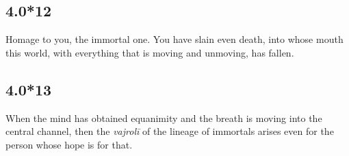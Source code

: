 \begin{ekdosis}
\subsection*{4.0*12}
\begin{translation}[hp04_000_12]
Homage to you, the immortal one. You have slain even death, into whose mouth this world, with everything that is moving and unmoving, has fallen.
\end{translation}


\begin{sources}[hp04_000_12]
\end{sources}

\begin{testimonia}[hp04_000_12]
\end{testimonia}



\subsection*{4.0*13}
\begin{translation}[hp04_000_13]
When the mind has obtained equanimity and the breath is moving into the central channel, then the \emph{vajrolī} of the lineage of immortals arises even for the person whose hope is for that.
\end{translation}


\end{ekdosis}
